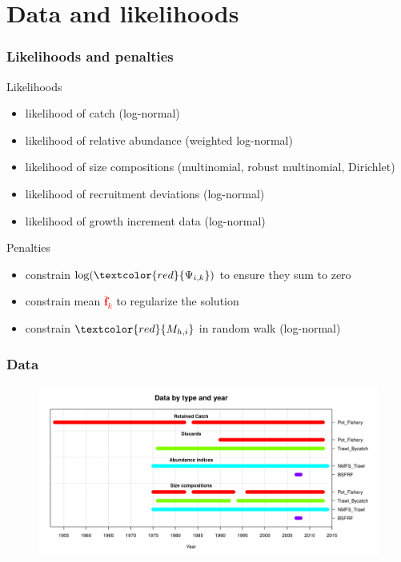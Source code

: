 \documentclass{beamer}
\begin{document}

\section{Data and likelihoods}


\begin{frame}
\frametitle{Likelihoods and penalties}
Likelihoods
\begin{itemize}
\item likelihood of catch (log-normal)
\item likelihood of relative abundance (weighted log-normal)
\item likelihood of size compositions (multinomial, robust multinomial, Dirichlet)
\item likelihood of recruitment deviations (log-normal)
\item likelihood of growth increment data (log-normal)
\end{itemize}
Penalties
\begin{itemize}
\item constrain $\log (\textcolor{red}{\Psi_{i,k}})$ to ensure they sum to zero
\item constrain mean \textcolor{red}{$\bar{\boldsymbol{f}}_k$} to regularize the
  solution
\item constrain $\textcolor{red}{M_{h,i}}$ in random walk (log-normal)
\end{itemize}
\end{frame}


\begin{frame}
\frametitle{Data}
\begin{figure}[!htbp]
  \centering
  \includegraphics[width=\linewidth]{../../examples/bbrkc/OneSex/figure/data.png}
\end{figure}
\end{frame}
\end{document}
